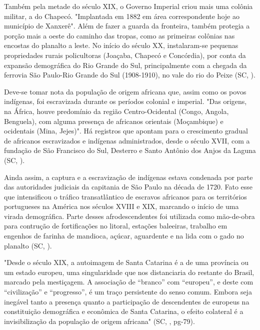 \indent Também pela metade do século XIX, o Governo Imperial criou mais uma colônia militar, a do Chapecó. "Implantada em 1882 em área correspondente hoje ao município de Xanxerê". Além de fazer a guarda da fronteira, também protegia a porção mais a oeste do caminho das tropas, como as primeiras colônias nas encostas do planalto a leste. No início do século XX, instalaram-se pequenas propriedades rurais policultoras (Joaçaba, Chapecó e Concórdia), por conta da expansão demográfica do Rio Grande do Sul, principalmente com a chegada da ferrovia São Paulo-Rio Grande do Sul (1908-1910), no vale do rio do Peixe (\acrlong{SC}, \citeyear{AtlasSCpopulacao}).

\indent Deve-se tomar nota da população de origem africana que, assim como os povos indígenas, foi escravizada durante os períodos colonial e imperial. "Das origens, na África, houve predomínio da região Centro-Ocidental (Congo, Angola, Benguela), com alguma presença de africanos orientais (Moçambique) e ocidentais (Mina, Jejes)". Há registros que apontam para o crescimento gradual de africanos escravizados e indígenas administrados, desde o século XVII, com a fundação de São Francisco do Sul, Desterro e Santo Antônio dos Anjos da Laguna (\acrlong{SC}, \citeyear{AtlasSCpopulacao}).

\indent Ainda assim, a captura e a escravização de indígenas estava condenada por parte das autoridades judiciais da capitania de São Paulo na década de 1720. Fato esse que intensificou o tráfico transatlântico de escravos africanos para os territórios portugueses na América nos séculos XVIII e XIX, marcando o início de uma virada demográfica. Parte desses afrodescendentes foi utilizada como mão-de-obra para contrução de fortificações no litoral, estações baleeiras, trabalho em engenhos de farinha de mandioca, açúcar, aguardente e na lida com o gado no planalto (\acrlong{SC}, \citeyear{AtlasSCpopulacao}). 

\begin{citacao}
"Desde o século XIX, a autoimagem de Santa Catarina é a de uma província ou um estado europeu, uma singularidade que nos distanciaria do restante do Brasil, marcado pela mestiçagem. A associação de “branco” com “europeu”, e deste com “civilização” e “progresso”, é um traço persistente do senso comum. Embora seja inegável tanto a presença quanto a participação de descendentes de europeus na constituição demográfica e econômica de Santa Catarina, o efeito colateral é a invisibilização da população de origem africana" (\acrlong{SC}, \citeyear{AtlasSCpopulacao}, pg-79).
\end{citacao}

